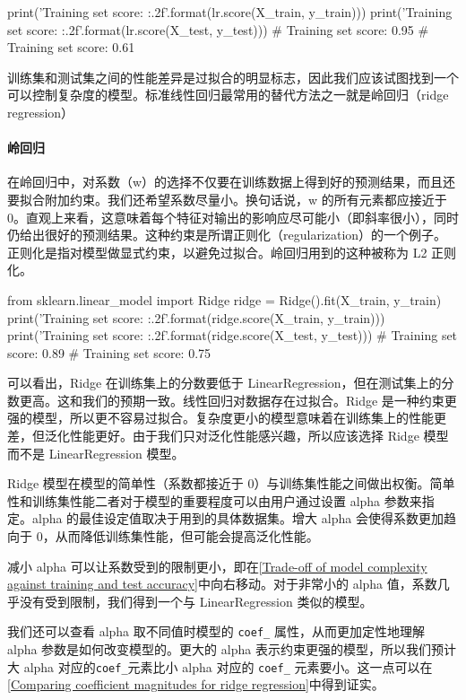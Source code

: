 \begin{pyc}
    print('Training set score: {:.2f}'.format(lr.score(X_train, y_train)))
    print('Training set score: {:.2f}'.format(lr.score(X_test, y_test)))
    # Training set score: 0.95
    # Training set score: 0.61
\end{pyc}
训练集和测试集之间的性能差异是过拟合的明显标志，因此我们应该试图找到一个可以控制复杂度的模型。标准线性回归最常用的替代方法之一就是岭回归（ridge regression）

\paragraph{岭回归} 在岭回归中，对系数（w）的选择不仅要在训练数据上得到好的预测结果，而且还要拟合附加约束。我们还希望系数尽量小。换句话说，w 的所有元素都应接近于 0。直观上来看，这意味着每个特征对输出的影响应尽可能小（即斜率很小），同时仍给出很好的预测结果。这种约束是所谓正则化（regularization）的一个例子。正则化是指对模型做显式约束，以避免过拟合。岭回归用到的这种被称为 L2 正则化。
\begin{pyc}
    from sklearn.linear_model import Ridge
    ridge = Ridge().fit(X_train, y_train)
    print('Training set score: {:.2f}'.format(ridge.score(X_train, y_train)))
    print('Training set score: {:.2f}'.format(ridge.score(X_test, y_test)))
    # Training set score: 0.89
    # Training set score: 0.75
\end{pyc}
可以看出，Ridge 在训练集上的分数要低于 LinearRegression，但在测试集上的分数更高。这和我们的预期一致。线性回归对数据存在过拟合。Ridge 是一种约束更强的模型，所以更不容易过拟合。复杂度更小的模型意味着在训练集上的性能更差，但泛化性能更好。由于我们只对泛化性能感兴趣，所以应该选择 Ridge 模型而不是 LinearRegression 模型。

Ridge 模型在模型的简单性（系数都接近于 0）与训练集性能之间做出权衡。简单性和训练集性能二者对于模型的重要程度可以由用户通过设置 alpha 参数来指定。alpha 的最佳设定值取决于用到的具体数据集。增大 alpha 会使得系数更加趋向于 0，从而降低训练集性能，但可能会提高泛化性能。

减小 alpha 可以让系数受到的限制更小，即在\autoref{Trade-off of model complexity against training and test accuracy}中向右移动。对于非常小的 alpha 值，系数几乎没有受到限制，我们得到一个与 LinearRegression 类似的模型。


我们还可以查看 alpha 取不同值时模型的 \verb|coef_| 属性，从而更加定性地理解 alpha 参数是如何改变模型的。更大的 alpha 表示约束更强的模型，所以我们预计大 alpha 对应的\verb|coef_|元素比小 alpha 对应的 \verb|coef_| 元素要小。这一点可以在\autoref{Comparing coefficient magnitudes for ridge regression}中得到证实。

